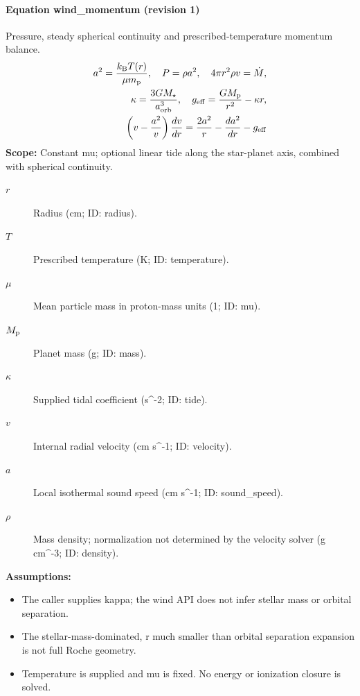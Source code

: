 
\paragraph{Equation wind\_momentum (revision 1)}
Pressure, steady spherical continuity and prescribed-temperature momentum balance.
\begin{equation}
\begin{aligned}
a^2=\frac{k_{\rm B}T(r)}{\mu m_{\rm p}},\quad P=\rho a^2,\quad 4\pi r^2\rho v=\dot M,\\
\kappa=\frac{3GM_\star}{a_{\rm orb}^3},\quad g_{\rm eff}=\frac{GM_{\rm p}}{r^2}-\kappa r,\\
\left(v-\frac{a^2}{v}\right)\frac{dv}{dr}=\frac{2a^2}{r}-\frac{da^2}{dr}-g_{\rm eff}
\end{aligned}
\label{eq:escape.parker_5f_wind:wind_5f_momentum:1}
\end{equation}
\noindent\textbf{Scope:} Constant mu; optional linear tide along the star-planet axis, combined with spherical continuity.

\begin{description}
\item[$r$] Radius (cm; ID: radius).
\item[$T$] Prescribed temperature (K; ID: temperature).
\item[$\mu$] Mean particle mass in proton-mass units (1; ID: mu).
\item[$M_{\rm p}$] Planet mass (g; ID: mass).
\item[$\kappa$] Supplied tidal coefficient (s\textasciicircum{}-2; ID: tide).
\item[$v$] Internal radial velocity (cm s\textasciicircum{}-1; ID: velocity).
\item[$a$] Local isothermal sound speed (cm s\textasciicircum{}-1; ID: sound\_speed).
\item[$\rho$] Mass density; normalization not determined by the velocity solver (g cm\textasciicircum{}-3; ID: density).
\end{description}

\noindent\textbf{Assumptions:}
\begin{itemize}
\item The caller supplies kappa; the wind API does not infer stellar mass or orbital separation.
\item The stellar-mass-dominated, r much smaller than orbital separation expansion is not full Roche geometry.
\item Temperature is supplied and mu is fixed. No energy or ionization closure is solved.
\end{itemize}

